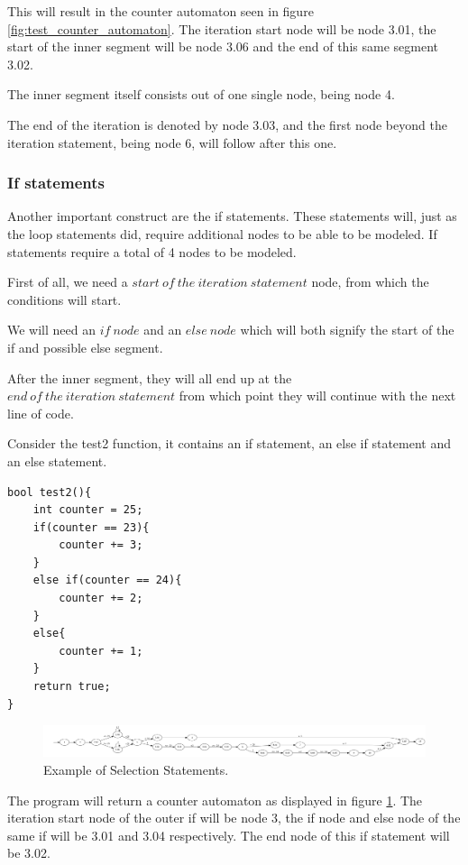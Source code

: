 \documentclass[12pt]{article}
\begin{document}
This will result in the counter automaton seen in figure \ref{fig:test_counter_automaton}. The iteration start node will be node 3.01, the start of the inner segment will be node 3.06 and the end of this same segment 3.02.

The inner segment itself consists out of one single node, being node 4.

The end of the iteration is denoted by node 3.03, and the first node beyond the iteration statement, being node 6, will follow after this one.

\subsubsection{If statements}
Another important construct are the if statements. These statements will, just as the loop statements did, require additional nodes to be able to be modeled. If statements require a total of 4 nodes to be modeled.

First of all, we need a $start\ of\ the\ iteration\ statement$ node, from which the conditions will start.

We will need an $if\ node$ and an $else\ node$ which will both signify the start of the if and possible else segment.

After the inner segment, they will all end up at the $end\ of\ the\ iteration\ statement$ from which point they will continue with the next line of code.

Consider the test2 function, it contains an if statement, an else if statement and an else statement.
\begin{lstlisting}[style=CStyle]
bool test2(){
	int counter = 25;
	if(counter == 23){
		counter += 3;
	}
	else if(counter == 24){
		counter += 2;
	}
	else{
		counter += 1;
	}
	return true;
}
\end{lstlisting}

\begin{figure}[h]
	\centering
	\includegraphics[width=\linewidth]{test2_counter_automaton}
	\caption{Example of Selection Statements.}
	\label{fig:test2_counter_automaton}
\end{figure}

The program will return a counter automaton as displayed in figure \ref{fig:test2_counter_automaton}. The iteration start node of the outer if will be node 3, the if node and else node of the same if will be 3.01 and 3.04 respectively. The end node of this if statement will be 3.02.
\end{document}

